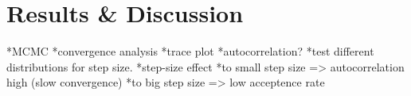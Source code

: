 \documentclass[a4paper,11pt]{kth-mag}
\begin{document}
    \chapter{Results \& Discussion}
        *MCMC
            *convergence analysis
                *trace plot
                *autocorrelation?
                *test different distributions for step size.
                    *step-size effect
                        *to small step size => autocorrelation high (slow convergence)
                        *to big step size => low acceptence rate
\end{document}
